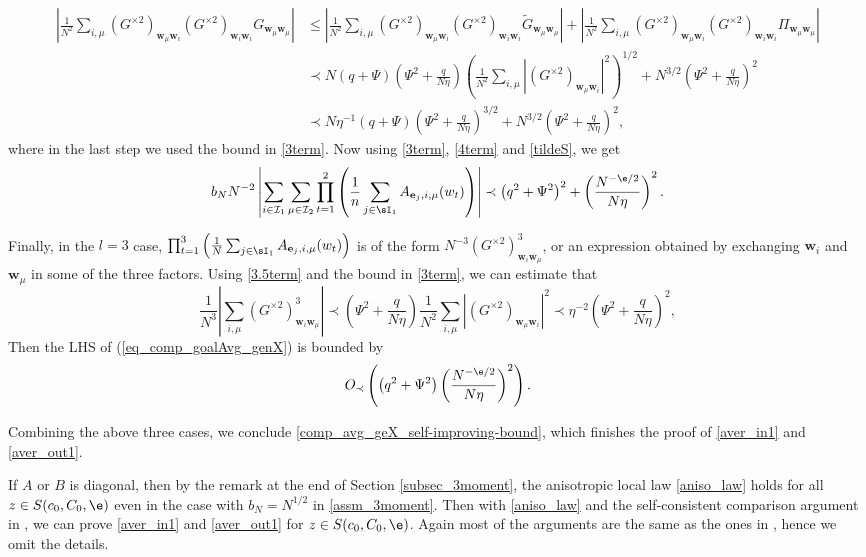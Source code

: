 \begin{align}
\left|\frac{1}{N^2}\sum_{i,\mu}( G^{\times 2} )_{\mathbf w_\mu\mathbf w_i}(G^{\times 2})_{\mathbf w_i\mathbf w_i} G_{\mathbf w_\mu\mathbf w_\mu}\right| & \le \left|\frac{1}{N^2}\sum_{i,\mu}( G^{\times 2} )_{\mathbf w_\mu\mathbf w_i}(G^{\times 2})_{\mathbf w_i\mathbf w_i} \tilde G_{\mathbf w_\mu\mathbf w_\mu}\right| + \left|\frac{1}{N^2}\sum_{i,\mu}( G^{\times 2} )_{\mathbf w_\mu\mathbf w_i}(G^{\times 2})_{\mathbf w_i\mathbf w_i} \Pi_{\mathbf w_\mu\mathbf w_\mu}\right| \nonumber\\
& \prec N(q+\Psi)\left( \Psi^2 + \frac{q}{N\eta}\right)\left(\frac{1}{N^2}\sum_{i,\mu}\left|( G^{\times 2} )_{\mathbf w_\mu\mathbf w_i}\right|^2\right)^{1/2} +N^{3/2}\left( \Psi^2 + \frac{q}{N\eta}\right)^2 \nonumber\\
& \prec N\eta^{-1}(q+\Psi)\left( \Psi^2 + \frac{q}{N\eta}\right)^{3/2} +N^{3/2}\left( \Psi^2 + \frac{q}{N\eta}\right)^2,\label{4term}
\end{align}
where in the last step we used the bound in \eqref{3term}. Now using \eqref{3term}, \eqref{4term} and \eqref{tildeS}, we get
$$b_N N^{-2}\left|\sum_{i\in\mathcal I_1}\sum_{\mu\in\mathcal I_2} \prod_{t=1}^{2}\left(\frac{1}{n}\sum_{j\in\sI_1}A_{ \mathbf e_j, i, \mu}(w_t)\right)\right| \prec \left(q^2+\Psi^2\right)^{2} + \left( \frac{N^{-\e/2}}{N\eta}\right)^2 .$$%

Finally, in the $l=3$ case, $\prod_{t=1}^{3}\left(\frac{1}{N}\sum_{j\in\sI_1}A_{ \mathbf e_j, i, \mu}(w_t)\right)$ is of the form 
${N^{-3}}( G^{\times 2})^3_{\mathbf w_i\mathbf w_\mu}$, or an expression obtained by exchanging $\mathbf w_i$ and $\mathbf w_\mu$ in some of the three factors. Using \eqref{3.5term} and the bound in \eqref{3term}, we can estimate that %
$$\frac{1}{N^3}\left|\sum_{i,\mu}( G^{\times 2})^3_{\mathbf w_i\mathbf w_\mu}\right| \prec \left( \Psi^2 + \frac{q}{N\eta}\right)\frac{1}{N^2}\sum_{i,\mu}\left|( G^{\times 2} )_{\mathbf w_\mu\mathbf w_i}\right|^2 \prec \eta^{-2}\left(\Psi^2 +\frac{q}{N\eta}\right)^2,$$
Then the LHS of (\ref{eq_comp_goalAvg_genX}) is bounded by 
$$O_\prec\left(\left(q^2 + \Psi^2\right) \left(\frac{N^{-\e/2}}{N\eta}\right)^2\right).$$

Combining the above three cases, we conclude \eqref{comp_avg_geX_self-improving-bound}, which finishes the proof of \eqref{aver_in1} and \eqref{aver_out1}. %

If $A$ or $B$ is diagonal, then by the remark at the end of Section \ref{subsec_3moment}, the anisotropic local law \eqref{aniso_law} holds for all $z\in S(c_0,C_0,\e)$ even in the case with $b_N=N^{1/2}$ in \eqref{assm_3moment}. Then with \eqref{aniso_law} and the self-consistent comparison argument in \cite[Section 9]{Anisotropic}, we can prove \eqref{aver_in1} and \eqref{aver_out1} for $z\in S(c_0,C_0,\e)$. Again most of the arguments are the same as the ones in \cite[Section 9]{Anisotropic}, hence we omit the details. 

